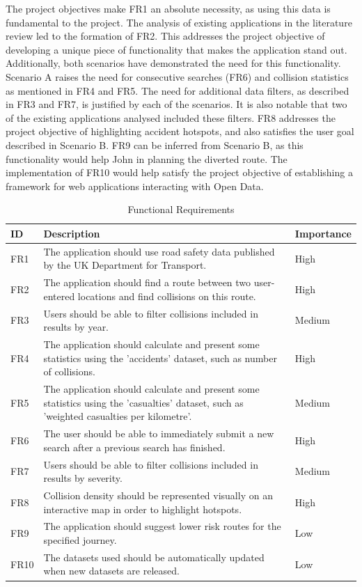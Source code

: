 \documentclass[authoryearcitations]{UoYCSproject}
\begin{document}
The project objectives make FR1 an absolute necessity, as using this data is fundamental to the project. The analysis of existing applications in the literature review led to the formation of FR2. This addresses the project objective of developing a unique piece of functionality that makes the application stand out. Additionally, both scenarios have demonstrated the need for this functionality. Scenario A raises the need for consecutive searches (FR6) and collision statistics as mentioned in FR4 and FR5. The need for additional data filters, as described in FR3 and FR7, is justified by each of the scenarios. It is also notable that two of the existing applications analysed included these filters. FR8 addresses the project objective of highlighting accident hotspots, and also satisfies the user goal described in Scenario B. FR9 can be inferred from Scenario B, as this functionality would help John in planning the diverted route. The implementation of FR10 would help satisfy the project objective of establishing a framework for web applications interacting with Open Data.

\begin{table}[tbp]
\caption{Functional Requirements}
\begin{tabular}{| p{1.5cm} | p{7.5cm} | p{2cm} |}
	\hline
	\textbf{ID} & \textbf{Description} & \textbf{Importance} \\ \hline
	FR1 & The application should use road safety data published by the UK Department for Transport. & High \\ \hline
	FR2 & The application should find a route between two user-entered locations and find collisions on this route. & High \\ \hline
	FR3 & Users should be able to filter collisions included in results by year. & Medium \\ \hline
	FR4 & The application should calculate and present some statistics using the 'accidents' dataset, such as number of collisions. & High \\ \hline
	FR5 & The application should calculate and present some statistics using the 'casualties' dataset, such as 'weighted casualties per kilometre'. & Medium \\ \hline
	FR6 & The user should be able to immediately submit a new search after a previous search has finished. & High \\ \hline
	FR7 & Users should be able to filter collisions included in results by severity. & Medium \\ \hline
	FR8 & Collision density should be represented visually on an interactive map in order to highlight hotspots. & High \\ \hline
	FR9 & The application should suggest lower risk routes for the specified journey. & Low \\ \hline
	FR10 & The datasets used should be automatically updated when new datasets are released. & Low \\ \hline
\end{tabular}
\label{tab:FunctionalReqs}
\end{table}
\end{document}
